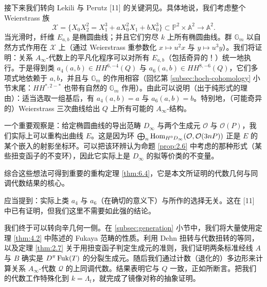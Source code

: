 接下来我们转向 Lekili 与 Perutz [11] 的关键洞见。具体地说，我们考虑整个 Weierstrass 族
\[
\mathcal{X}=\{X_0X_2^2=X_1^3+aX_0^2X_1+bX_0^3\}\subset\mathbb{P}^2\times\mathbb{A}^2\to\mathbb{A}^2 .
\]
当光滑时，纤维 $E_{a,b}$ 是椭圆曲线；并且它们穷尽 $k$ 上所有椭圆曲线。群 $\mathbb{G}_m$ 以自然方式作用在 $\mathcal{X}$ 上（通过 Weierstrass 重参数化 $x\mapsto u^2x$ 与 $y\mapsto u^3y$）。我们将证明：关系 $A_\infty$-代数上的平凡化程序可以对所有 $E_{a,b}$（包括奇异的！）统一地执行。于是得到类 $a_4(a,b)\in HH^{6,-4}(Q)$ 与 $a_6(a,b)\in HH^{8,-6}(Q)$，它们多项式地依赖于 $a,b$，并且与 $\mathbb{G}_m$ 的作用相容（回忆第 \ref{subsec:hoch-cohomology} 小节末尾：$HH^{*,2-*}$ 也带有自然的 $\mathbb{G}_m$ 作用）。由此可以说明（出于纯形式的理由）：适当选取一组基后，有 $a_4(a,b)=a$ 与 $a_6(a,b)=b$。特别地，（可能奇异的）Weierstrass 三次曲线给出 $Q$ 上所有可能的 $A_\infty$-结构。



一个重要观察是：给定椭圆曲线的导出范畴 $D_\infty$ 与两个生成元 $\mathcal{O}$ 与 $\mathcal{O}(P)$，我们实际上可以重构出曲线 $E$。这是因为环 $\bigoplus_n\operatorname{Hom}_{H^0D_\infty}(\mathcal{O},\mathcal{O}(3nP))$ 正是 $E$ 的某个嵌入的射影坐标环。可以把该环辨认为命题 \ref{prop:2.6} 中考虑的那种形式（某些扭变函子的不变环），因此它实际上是 $D_\infty$ 的拟等价类的不变量。

综合这些想法可得到重要的重构定理 \ref{thm:6.4}，它是本文所证明的代数几何与同调代数结果的核心。

应当提到：实际上类 $a_4$ 与 $a_6$（在确切的意义下）与所作的选择无关。这在 [11] 中已有证明，但我们这里不需要如此强的结论。

我们终于可以转向辛几何一侧。在 \ref{subsec:generation} 小节中，我们将大量使用定理 \ref{thm:4.2} 中陈述的 Fukaya 范畴的性质。利用 Dehn 扭转与代数扭转的等同，以及定理 \ref{thm:2.7} 关于用扭变函子判定生成元的准则，我们证明两条标准经线 $A$ 与 $B$ 确实是 $D^\pi\operatorname{Fuk}(T)$ 的分裂生成元。随后我们通过计数（退化的）多边形来计算关系 $A_\infty$-代数 $\mathcal{Q}$ 的上同调代数。结果表明它与 $Q$ 一致，正如所断言。把我们的代数工作特殊化到 $k=\Lambda_t$，就完成了镜像对称的抽象证明。

